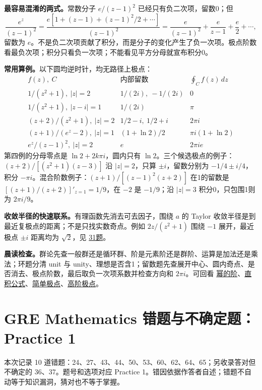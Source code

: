 \documentclass[11pt,a4paper,fontset=fandol]{ctexart}
\begin{document}
\textbf{最容易混淆的两式。}常数分子 $e/(z-1)^2$ 已经只有负二次项，留数0；但
\[
\frac{e^z}{(z-1)^2}
=\frac{e[1+(z-1)+(z-1)^2/2+\cdots]}{(z-1)^2}
=\frac e{(z-1)^2}+\frac e{z-1}+\frac e2+\cdots,
\]
留数为 $e$。不是负二次项贡献了积分，而是分子的变化产生了负一次项。极点阶数看最负次项；积分只看负一次项；不能看见平方分母就宣布积分0。

\textbf{常用算例。}以下圆均逆时针，均无路径上极点：
\[
\begin{array}{c|c|c}
f(z),\ C&\text{内部留数}&\oint_Cf(z)\,dz\\\hline
1/(z^2+1),\ |z|=2&1/(2i),\ -1/(2i)&0\\
1/(z^2+1),\ |z-i|=1&1/(2i)&\pi\\
(z+2)/(z^2+1),\ |z|=2&1/2-i,\ 1/2+i&2\pi i\\
(z+1)/(e^z-2),\ |z|=1&(1+\ln2)/2&\pi i(1+\ln2)\\
e^z/(z-1)^2,\ |z|=2&e&2\pi i e
\end{array}
\]
第四例的分母零点是 $\ln2+2k\pi i$，圆内只有 $\ln2$。三个候选极点的例子：$(z+2)/[(z^2+1)(z-3)]$ 沿 $|z|=2$，只算 $\pm i$，留数分别为 $-1/4\pm i/4$，积分 $-\pi i$。混合阶数例子：$(z+1)/[(z-1)^2(z+2)]$ 在1的留数是 $\left[(z+1)/(z+2)\right]'_{z=1}=1/9$，在 $-2$ 是 $-1/9$；沿 $|z|=3$ 积分0，只包围1则为 $2\pi i/9$。

\textbf{收敛半径的快速联系。}有理函数先消去可去因子，围绕 $a$ 的 Taylor 收敛半径是到最近复极点的距离；不是只找实数奇点。例如 $2z/(z^2+1)$ 围绕 $-1$ 展开，最近极点 $\pm i$ 距离均为 $\sqrt2$，见 \hyperref[ms:q31]{31题}。

\textbf{晨读检查。}群论先查一般群还是循环群、阶是元素阶还是群阶、运算是加法还是乘法；环题分清 unit 与 unity、理想是否含1；留数题先查展开中心、圆内奇点、是否消去、极点阶数，最后取负一次项系数并检查方向和 $2\pi i$。可回看 \hyperref[review:order-power]{幂的阶}、\hyperref[review:direct-product]{直积公式}、\hyperref[review:simple-residue]{简单极点}、\hyperref[review:higher-residue]{高阶极点}。
\clearpage
\hypertarget{gre-mathematics-ux9519ux9898ux4e0eux4e0dux786eux5b9aux9898practice-1}{%
\section{GRE Mathematics 错题与不确定题：Practice
1}\label{gre-mathematics-ux9519ux9898ux4e0eux4e0dux786eux5b9aux9898practice-1}}

本次记录 10
道错题：24、27、43、44、50、53、60、62、64、65；另收录答对但不确定的
36、37。题号和选项对应 Practice
1。错因依据作答者自述；错题不自动等于知识漏洞，猜对也不等于掌握。
\end{document}

